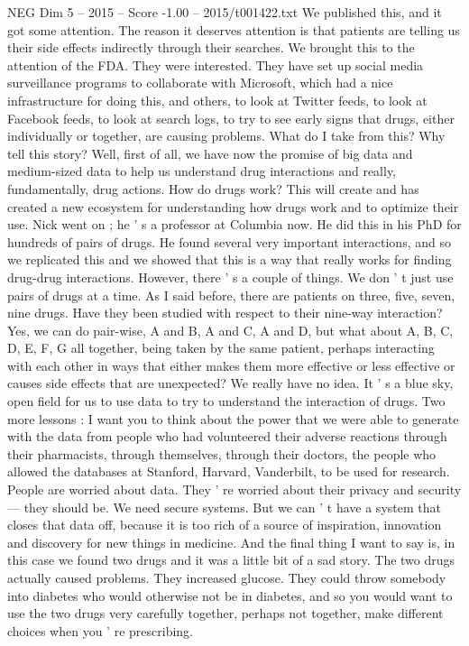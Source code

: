 \begin{textsample}{NEG Dim 5 – 2015 – Score -1.00 – 2015/t001422.txt}
We published this, and it got some attention.
The reason it deserves attention is that patients are telling us their side effects indirectly through their searches.
We brought this to the attention of the FDA.
They were interested.
They have set up social media surveillance programs to collaborate with Microsoft, which had a nice infrastructure for doing this, and others, to look at Twitter feeds, to look at Facebook feeds, to look at search logs, to try to see early signs that drugs, either individually or together, are causing problems.
What do I take from this?
Why tell this story?
Well, first of all, we have now the promise of big data and medium-sized data to help us understand drug interactions and really, fundamentally, drug actions.
How do drugs work?
This will create and has created a new ecosystem for understanding how drugs work and to optimize their use.
Nick went on ; he ' s a professor at Columbia now.
He did this in his PhD for hundreds of pairs of drugs.
He found several very important interactions, and so we replicated this and we showed that this is a way that really works for finding drug-drug interactions.
However, there ' s a couple of things.
We don ' t just use pairs of drugs at a time.
As I said before, there are patients on three, five, seven, nine drugs.
Have they been studied with respect to their nine-way interaction?
Yes, we can do pair-wise, A and B, A and C, A and D, but what about A, B, C, D, E, F, G all together, being taken by the same patient, perhaps interacting with each other in ways that either makes them more effective or less effective or causes side effects that are unexpected?
We really have no idea.
It ' s a blue sky, open field for us to use data to try to understand the interaction of drugs.
Two more lessons : I want you to think about the power that we were able to generate with the data from people who had volunteered their adverse reactions through their pharmacists, through themselves, through their doctors, the people who allowed the databases at Stanford, Harvard, Vanderbilt, to be used for research.
People are worried about data.
They ' re worried about their privacy and security — they should be.
We need secure systems.
But we can ' t have a system that closes that data off, because it is too rich of a source of inspiration, innovation and discovery for new things in medicine.
And the final thing I want to say is, in this case we found two drugs and it was a little bit of a sad story.
The two drugs actually caused problems.
They increased glucose.
They could throw somebody into diabetes who would otherwise not be in diabetes, and so you would want to use the two drugs very carefully together, perhaps not together, make different choices when you ' re prescribing.

\end{textsample}
